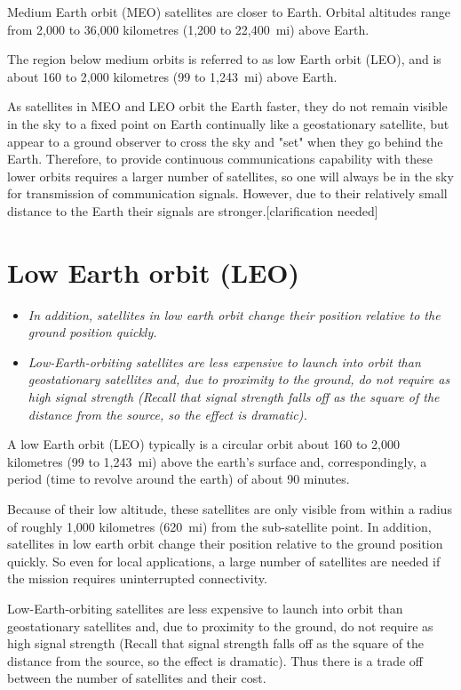 Medium Earth orbit (MEO) satellites are closer to Earth. Orbital
altitudes range from 2,000 to 36,000 kilometres (1,200 to 22,400~mi)
above Earth.

The region below medium orbits is referred to as low Earth orbit (LEO),
and is about 160 to 2,000 kilometres (99 to 1,243~mi) above Earth.

As satellites in MEO and LEO orbit the Earth faster, they do not remain
visible in the sky to a fixed point on Earth continually like a
geostationary satellite, but appear to a ground observer to cross the
sky and "set" when they go behind the Earth. Therefore, to provide
continuous communications capability with these lower orbits requires a
larger number of satellites, so one will always be in the sky for
transmission of communication signals. However, due to their relatively
small distance to the Earth their signals are stronger.{[}clarification
needed{]}

\section{Low Earth orbit (LEO)}\label{low-earth-orbit-leo}

\begin{itemize}
\item
  \emph{In addition, satellites in low earth orbit change their position
  relative to the ground position quickly.}
\item
  \emph{Low-Earth-orbiting satellites are less expensive to launch into
  orbit than geostationary satellites and, due to proximity to the
  ground, do not require as high signal strength (Recall that signal
  strength falls off as the square of the distance from the source, so
  the effect is dramatic).}
\end{itemize}

A low Earth orbit (LEO) typically is a circular orbit about 160 to 2,000
kilometres (99 to 1,243~mi) above the earth's surface and,
correspondingly, a period (time to revolve around the earth) of about 90
minutes.

Because of their low altitude, these satellites are only visible from
within a radius of roughly 1,000 kilometres (620~mi) from the
sub-satellite point. In addition, satellites in low earth orbit change
their position relative to the ground position quickly. So even for
local applications, a large number of satellites are needed if the
mission requires uninterrupted connectivity.

Low-Earth-orbiting satellites are less expensive to launch into orbit
than geostationary satellites and, due to proximity to the ground, do
not require as high signal strength (Recall that signal strength falls
off as the square of the distance from the source, so the effect is
dramatic). Thus there is a trade off between the number of satellites
and their cost.

